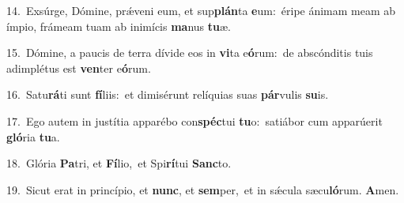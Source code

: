 {\numbfont\textcolor{\numbcolor}{14.}}~Exsúrge, Dómine, prǽveni eum, et sup\-\textbf{plán}\-ta \textbf{e}\-um:~\star éripe ánimam meam ab ímpio, frámeam tuam ab inimícis \textbf{ma}\-nus \textbf{tu}\-æ.\par
{\numbfont\textcolor{\numbcolor}{15.}}~Dómine, a paucis de terra dívide eos in \textbf{vi}\-ta e\-\textbf{ó}\-rum:~\star de abscónditis tuis adimplétus est \textbf{ven}\-ter e\-\textbf{ó}\-rum.\par
{\numbfont\textcolor{\numbcolor}{16.}}~Satu\-\textbf{rá}\-ti sunt \textbf{fí}\-liis:~\star et dimisérunt relíquias suas \textbf{pár}\-vulis \textbf{su}\-is.\par
{\numbfont\textcolor{\numbcolor}{17.}}~Ego autem in justítia apparébo con\-\textbf{spéc}\-tui \textbf{tu}\-o:~\star satiábor cum apparúerit \textbf{gló}\-ria \textbf{tu}\-a.\par
{\numbfont\textcolor{\numbcolor}{18.}}~Glória \textbf{Pa}\-tri, et \textbf{Fí}\-lio,~\star et Spi\-\textbf{rí}\-tui \textbf{Sanc}\-to.\par
{\numbfont\textcolor{\numbcolor}{19.}}~Sicut erat in princípio, et \textbf{nunc}\-, et \textbf{sem}\-per,~\star et in sǽcula sæcu\-\textbf{ló}\-rum. \textbf{A}\-men.\par
